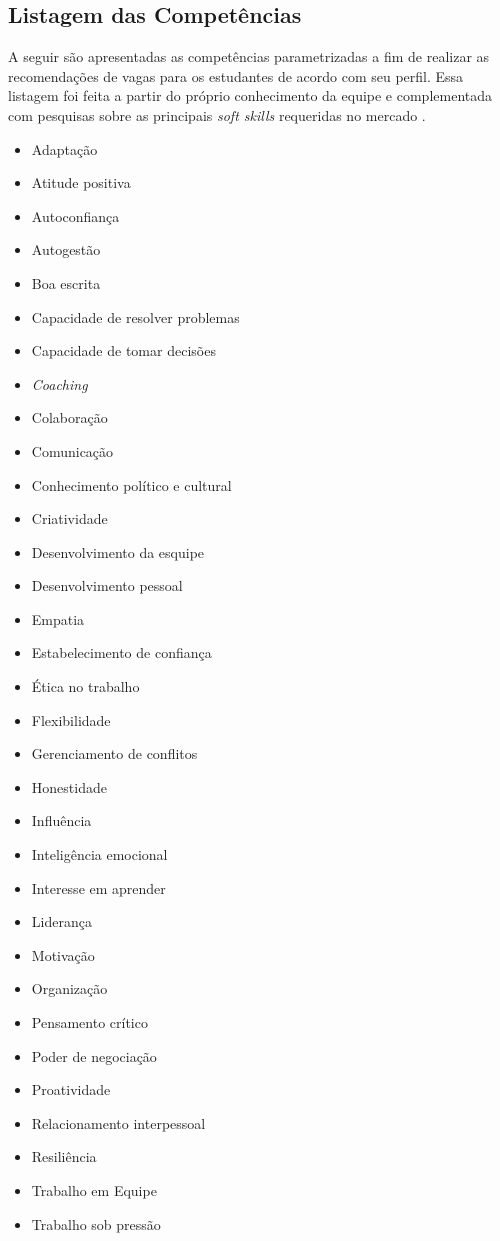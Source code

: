 \subsection{Listagem das Competências}
A seguir são apresentadas as competências parametrizadas a fim de realizar as recomendações de vagas para os estudantes de acordo com seu perfil. Essa listagem foi feita a partir do próprio conhecimento da equipe e complementada com pesquisas sobre as principais \textit{soft skills} requeridas no mercado \cite{fia_softskills,vagas_softskills, alura_softskills}. 

\begin{itemize}
	\label{softskills}
	\item Adaptação
	\item Atitude positiva
	\item Autoconfiança
	\item Autogestão
	\item Boa escrita
	\item Capacidade de resolver problemas
	\item Capacidade de tomar decisões
	\item \textit{Coaching}
	\item Colaboração
	\item Comunicação
	\item Conhecimento político e cultural
	\item Criatividade
	\item Desenvolvimento da esquipe
	\item Desenvolvimento pessoal
	\item Empatia
	\item Estabelecimento de confiança
	\item Ética no trabalho
	\item Flexibilidade
	\item Gerenciamento de conflitos
	\item Honestidade
	\item Influência
	\item Inteligência emocional
	\item Interesse em aprender
	\item Liderança
	\item Motivação
	\item Organização
	\item Pensamento crítico
	\item Poder de negociação
	\item Proatividade
	\item Relacionamento interpessoal
	\item Resiliência
	\item Trabalho em Equipe
	\item Trabalho sob pressão
\end{itemize}
